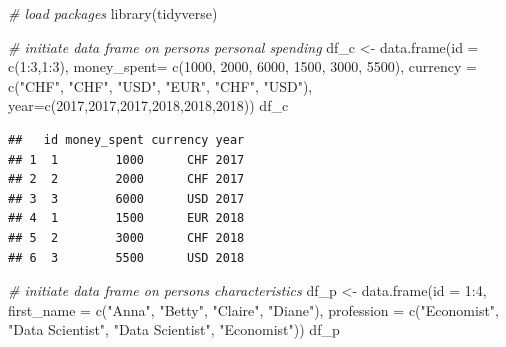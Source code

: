\documentclass[
  12pt,
]{style/krantz}
\newenvironment{Shaded}{\begin{snugshade}}{\end{snugshade}}
\newcommand{\AttributeTok}[1]{\textcolor[rgb]{0.77,0.63,0.00}{#1}}
\newcommand{\CommentTok}[1]{\textcolor[rgb]{0.56,0.35,0.01}{\textit{#1}}}
\newcommand{\DecValTok}[1]{\textcolor[rgb]{0.00,0.00,0.81}{#1}}
\newcommand{\FunctionTok}[1]{\textcolor[rgb]{0.00,0.00,0.00}{#1}}
\newcommand{\NormalTok}[1]{#1}
\newcommand{\OtherTok}[1]{\textcolor[rgb]{0.56,0.35,0.01}{#1}}
\newcommand{\SpecialCharTok}[1]{\textcolor[rgb]{0.00,0.00,0.00}{#1}}
\newcommand{\StringTok}[1]{\textcolor[rgb]{0.31,0.60,0.02}{#1}}
\begin{document}
\begin{Shaded}
\begin{Highlighting}[]
\CommentTok{\# load packages}
\FunctionTok{library}\NormalTok{(tidyverse)}

\CommentTok{\# initiate data frame on persons\textquotesingle{} personal spending}
\NormalTok{df\_c }\OtherTok{\textless{}{-}} \FunctionTok{data.frame}\NormalTok{(}\AttributeTok{id =} \FunctionTok{c}\NormalTok{(}\DecValTok{1}\SpecialCharTok{:}\DecValTok{3}\NormalTok{,}\DecValTok{1}\SpecialCharTok{:}\DecValTok{3}\NormalTok{),}
                   \AttributeTok{money\_spent=} \FunctionTok{c}\NormalTok{(}\DecValTok{1000}\NormalTok{, }\DecValTok{2000}\NormalTok{, }\DecValTok{6000}\NormalTok{, }\DecValTok{1500}\NormalTok{, }\DecValTok{3000}\NormalTok{, }\DecValTok{5500}\NormalTok{),}
                   \AttributeTok{currency =} \FunctionTok{c}\NormalTok{(}\StringTok{"CHF"}\NormalTok{, }\StringTok{"CHF"}\NormalTok{, }\StringTok{"USD"}\NormalTok{, }\StringTok{"EUR"}\NormalTok{, }\StringTok{"CHF"}\NormalTok{, }\StringTok{"USD"}\NormalTok{),}
                   \AttributeTok{year=}\FunctionTok{c}\NormalTok{(}\DecValTok{2017}\NormalTok{,}\DecValTok{2017}\NormalTok{,}\DecValTok{2017}\NormalTok{,}\DecValTok{2018}\NormalTok{,}\DecValTok{2018}\NormalTok{,}\DecValTok{2018}\NormalTok{))}
\NormalTok{df\_c}
\end{Highlighting}
\end{Shaded}

\begin{verbatim}
##   id money_spent currency year
## 1  1        1000      CHF 2017
## 2  2        2000      CHF 2017
## 3  3        6000      USD 2017
## 4  1        1500      EUR 2018
## 5  2        3000      CHF 2018
## 6  3        5500      USD 2018
\end{verbatim}

\begin{Shaded}
\begin{Highlighting}[]
\CommentTok{\# initiate data frame on persons\textquotesingle{} characteristics}
\NormalTok{df\_p }\OtherTok{\textless{}{-}} \FunctionTok{data.frame}\NormalTok{(}\AttributeTok{id =} \DecValTok{1}\SpecialCharTok{:}\DecValTok{4}\NormalTok{,}
                   \AttributeTok{first\_name =} \FunctionTok{c}\NormalTok{(}\StringTok{"Anna"}\NormalTok{, }\StringTok{"Betty"}\NormalTok{, }\StringTok{"Claire"}\NormalTok{, }\StringTok{"Diane"}\NormalTok{),}
                   \AttributeTok{profession =} \FunctionTok{c}\NormalTok{(}\StringTok{"Economist"}\NormalTok{, }\StringTok{"Data Scientist"}\NormalTok{,}
                                  \StringTok{"Data Scientist"}\NormalTok{, }\StringTok{"Economist"}\NormalTok{))}
\NormalTok{df\_p}
\end{Highlighting}
\end{Shaded}
\end{document}
